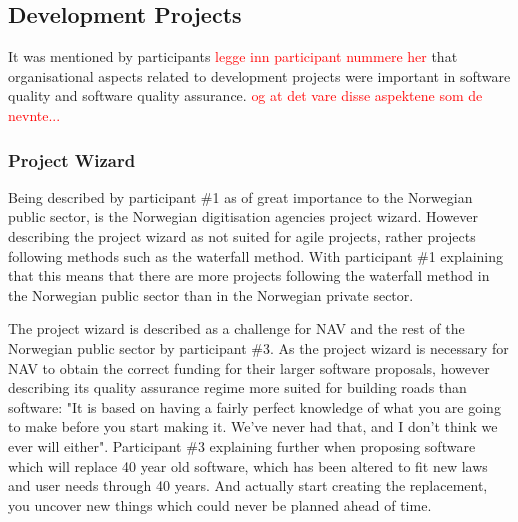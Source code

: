 
\subsection{Development Projects}
It was mentioned by participants \textcolor{red}{legge inn participant nummere her} that organisational aspects related to development projects were important in software quality and software quality assurance. \textcolor{red}{og at det vare disse aspektene som de nevnte...}

\subsubsection{Project Wizard} \label{sec:project_wizard}
Being described by participant \#1 as of great importance to the Norwegian public sector, is the Norwegian digitisation agencies project wizard. However describing the project wizard as not suited for agile projects, rather projects following methods such as the waterfall method. With participant \#1 explaining that this means that there are more projects following the waterfall method in the Norwegian public sector than in the Norwegian private sector.


The project wizard is described as a challenge for NAV and the rest of the Norwegian public sector by participant \#3. As the project wizard is necessary for NAV to obtain the correct funding for their larger software proposals, however describing its quality assurance regime more suited for building roads than software: "It is based on having a fairly perfect knowledge of what you are going to make before you start making it. We've never had that, and I don't think we ever will either". Participant \#3 explaining further when proposing software which will replace 40 year old software, which has been altered to fit new laws and user needs through 40 years. And actually start creating the replacement, you uncover new things which could never be planned ahead of time.

